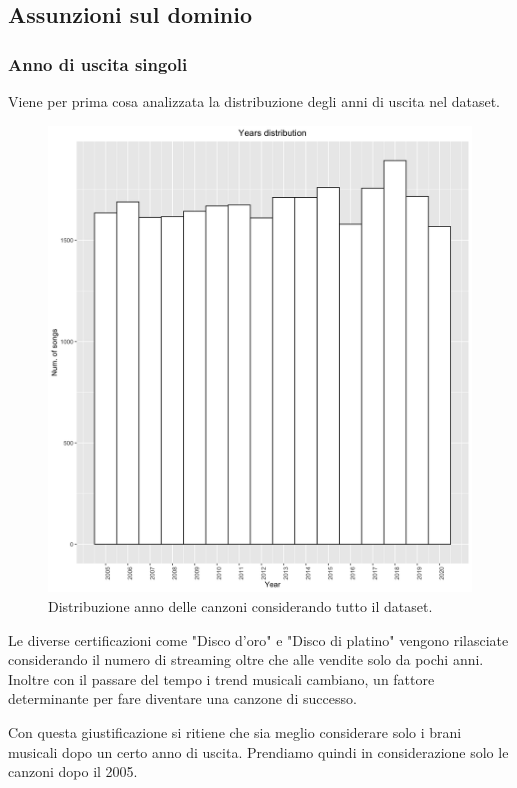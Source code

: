 \subsection{Assunzioni sul dominio}
\label{sec:assunzioni}
\subsubsection{Anno di uscita singoli}
Viene per prima cosa analizzata la distribuzione degli anni di uscita nel dataset.

\begin{figure}[H]
	\centering
	\includegraphics[width=13cm]{../images/years_distribution.png}
	\caption{Distribuzione anno delle canzoni considerando tutto il dataset.}
	\label{fig:year_distribution_all}
\end{figure}

Le diverse certificazioni come "Disco d'oro" e "Disco di platino"
vengono rilasciate considerando il numero di streaming oltre che alle
vendite solo da pochi anni. Inoltre con il passare del tempo i trend
musicali cambiano, un fattore determinante per fare diventare una
canzone di successo.

Con questa giustificazione si ritiene che sia meglio considerare solo
i brani musicali dopo un certo anno di uscita. Prendiamo quindi in
considerazione solo le canzoni dopo il 2005.


